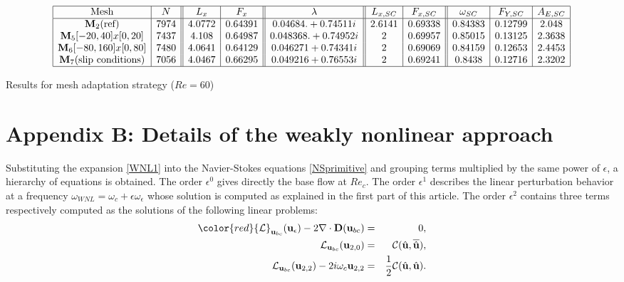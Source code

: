 \documentclass[twocolumn,10pt]{asme2ej}
\begin{document}
\begin{table*}
$$
\begin{array}{|c|c||c|c||c||c|c||c|c|c|}
\hline
\mbox{Mesh} & N & L_x & F_x & \lambda & L_{x,SC} & F_{x,SC} & \omega_{SC}  & F_{Y,SC} & A_{E,SC} \\
\hline
\mathbf{M}_2 \mbox{(ref)} 	& 7974  	& 4.0772 & 0.64391 	& 0.04684. +  0.74511i 	& 2.6141  & 0.69338 	& 0.84383 & 0.12799 & 2.048   \\ 


\mathbf{M}_5 [-20,40]x[0,20] 	& 7437	&  4.108 & 0.64987 	& 0.048368. +  0.74952i 	& 2  & 0.69957 	& 0.85015 & 0.13125 & 2.3638   \\ 
\mathbf{M}_6 [-80,160]x[0,80] 	& 7480	& 4.0641 & 0.64129		& 0.046271 + 0.74341i 	& 2 	& 0.69069 	& 0.84159 & 0.12653 & 2.4453 \\
\mathbf{M}_7 \mbox{(slip conditions)}	 & 7056	& 4.0467 &0.66295		& 0.049216+0.76553i 	& 2 	& 0.69241		& 0.8438  & 0.12716	 & 2.3202 \\
\hline
\end{array}
$$
\caption{Results for mesh adaptation strategy ($Re = 60$)}
\end{table*}

\section*{{\color{red}Appendix B: }Details of the weakly nonlinear approach}

Substituting the expansion \ref{WNL1} into the Navier-Stokes equations \ref{NSprimitive} and grouping terms multiplied by the same power of $\epsilon$, a hierarchy of equations is obtained. {\color{red} The order $\epsilon^0$ gives directly the base flow at $Re_c$. The order $\epsilon^1$ describes the linear perturbation behavior at a frequency $\omega_{WNL}=\omega_c+\epsilon\omega_\epsilon$ whose solution is computed as explained in the first part of this article.}
The order $\epsilon^2$ contains three terms respectively computed as the solutions of the following linear problems:
\begin{eqnarray}
{\color{red} {\cal L}_{{\bf u}_{bc}} ({\bf u}_\epsilon) - 2 \nabla \cdot {\bf D}({\bf u}_{bc})} &=&0,\\
{\cal L}_{{\bf u}_{bc}} ({\bf u}_{2,0}) &=& {\cal C}(\hat{\bf u},\overline{\hat{\bf u}}),\\
{\cal L}_{{\bf u}_{bc}} ({\bf u}_{2,2}) - 2 i \omega_c {\bf u}_{2,2}  &=& \frac{1}{2} {\cal C}(\hat{\bf u},\hat{\bf u}).
 \end{eqnarray}
\end{document}
